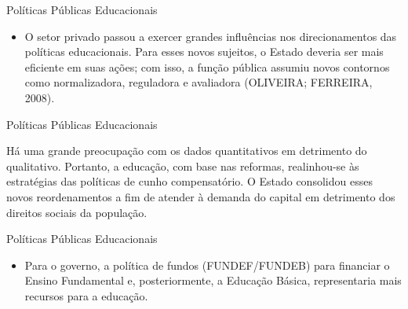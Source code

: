 \documentclass[12pt]{beamer}
\begin{document}
			\begin{frame}{Políticas Públicas Educacionais}
				\begin{itemize}
					\item O setor privado passou a exercer grandes influências nos direcionamentos
					das políticas educacionais. Para esses novos sujeitos, o Estado deveria ser mais
					eficiente em suas ações; com isso, a função pública assumiu novos contornos
					como normalizadora, reguladora e avaliadora (OLIVEIRA; FERREIRA, 2008).
					
				\end{itemize}
			\end{frame}
			
			\begin{frame}{Políticas Públicas Educacionais}
				\justifying
				
				Há uma grande preocupação com os dados quantitativos em detrimento do qualitativo. Portanto,
				a educação, com base nas reformas, realinhou-se às estratégias das políticas de
				cunho compensatório. O Estado consolidou esses novos reordenamentos a fim de atender à
				demanda do capital em detrimento dos direitos sociais da população.
			\end{frame}
			
			\begin{frame}{Políticas Públicas Educacionais}
				\begin{itemize}
					\item Para o governo, a política de fundos (FUNDEF/FUNDEB) para financiar o Ensino Fundamental
					e, posteriormente, a Educação Básica, representaria mais recursos para a
					educação.
					
					
				\end{itemize}
			\end{frame}
			
\end{document}
